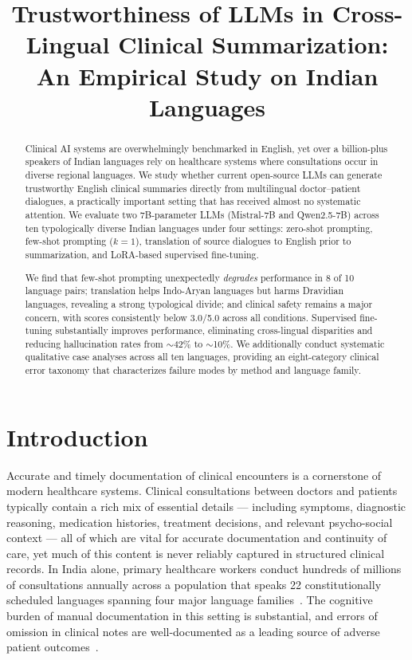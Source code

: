 \documentclass[conference]{IEEEtran}
\title{Trustworthiness of LLMs in Cross-Lingual Clinical Summarization:
An Empirical Study on Indian Languages}
\begin{document}
\maketitle

\begin{abstract}
Clinical AI systems are overwhelmingly benchmarked in English, yet over
a billion-plus speakers of Indian languages rely on healthcare systems
where consultations occur in diverse regional languages. We study whether
current open-source LLMs can generate trustworthy English clinical
summaries directly from multilingual doctor--patient dialogues, a
practically important setting that has received almost no systematic
attention. We evaluate two 7B-parameter LLMs (Mistral-7B and Qwen2.5-7B)
across ten typologically diverse Indian languages under four settings:
zero-shot prompting, few-shot prompting ($k{=}1$), translation of source
dialogues to English prior to summarization, and LoRA-based supervised
fine-tuning.

We find that few-shot prompting unexpectedly \emph{degrades} performance
in 8 of 10 language pairs; translation helps Indo-Aryan languages but harms
Dravidian languages, revealing a strong typological divide; and clinical
safety remains a major concern, with scores consistently below 3.0/5.0
across all conditions. Supervised fine-tuning substantially improves
performance, eliminating cross-lingual disparities and reducing
hallucination rates from $\sim$42\% to $\sim$10\%. We additionally conduct
systematic qualitative case analyses across all ten languages, providing an
eight-category clinical error taxonomy that characterizes failure modes by
method and language family.
\end{abstract}

\section{Introduction}

Accurate and timely documentation of clinical encounters is a cornerstone
of modern healthcare systems. Clinical consultations between doctors and
patients typically contain a rich mix of essential details --- including
symptoms, diagnostic reasoning, medication histories, treatment decisions,
and relevant psycho-social context --- all of which are vital for accurate
documentation and continuity of care, yet much of this content is never
reliably captured in structured clinical records. In India alone, primary
healthcare workers conduct hundreds of millions of consultations annually
across a population that speaks 22 constitutionally scheduled languages
spanning four major language families~\cite{gala2023indictrans2}. The
cognitive burden of manual documentation in this setting is substantial,
and errors of omission in clinical notes are well-documented as a leading
source of adverse patient outcomes~\cite{clusmann2023future}.
\end{document}
